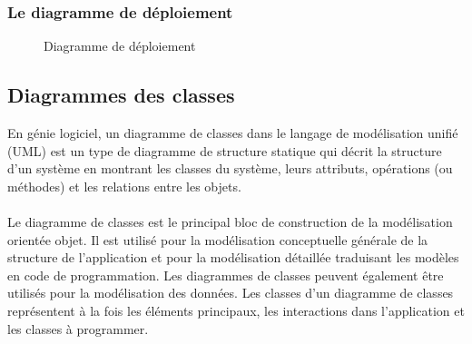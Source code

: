 \documentclass[12pt]{report}
\begin{document}
\vspace{0.2in}

\subsubsection{Le diagramme de déploiement}

\vspace{0.2in}

\begin{figure}[h]
\centering
    \centerline{}
    \caption{Diagramme de déploiement}
\end{figure}

\newpage

\subsection{Diagrammes des classes}

En génie logiciel, un diagramme de classes dans le langage de modélisation unifié (UML) est un type de diagramme de structure statique qui décrit la structure d'un système en montrant les classes du système, leurs attributs, opérations (ou méthodes) et les relations entre les objets.
\\\\
Le diagramme de classes est le principal bloc de construction de la modélisation orientée objet. Il est utilisé pour la modélisation conceptuelle générale de la structure de l'application et pour la modélisation détaillée traduisant les modèles en code de programmation. Les diagrammes de classes peuvent également être utilisés pour la modélisation des données. Les classes d'un diagramme de classes représentent à la fois les éléments principaux, les interactions dans l'application et les classes à programmer.
\end{document}
